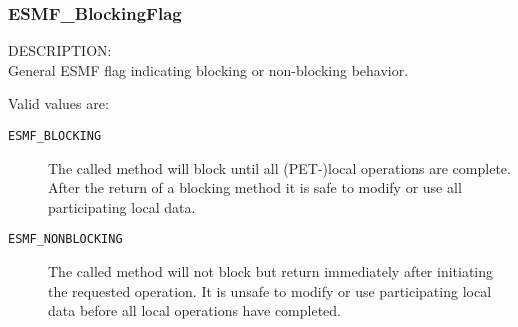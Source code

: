 
\subsubsection{ESMF\_BlockingFlag}

{\sf DESCRIPTION:\\}
General ESMF flag indicating blocking or non-blocking behavior.

Valid values are:
\begin{description}
   \item [{\tt ESMF\_BLOCKING}]
         The called method will block until all (PET-)local operations are 
         complete. After the return of a blocking method it is safe to modify
         or use all participating local data.
   \item [{\tt ESMF\_NONBLOCKING}]
         The called method will not block but return immediately after
         initiating the requested operation. It is unsafe to modify
         or use participating local data before all local operations have     
         completed.
\end{description}
